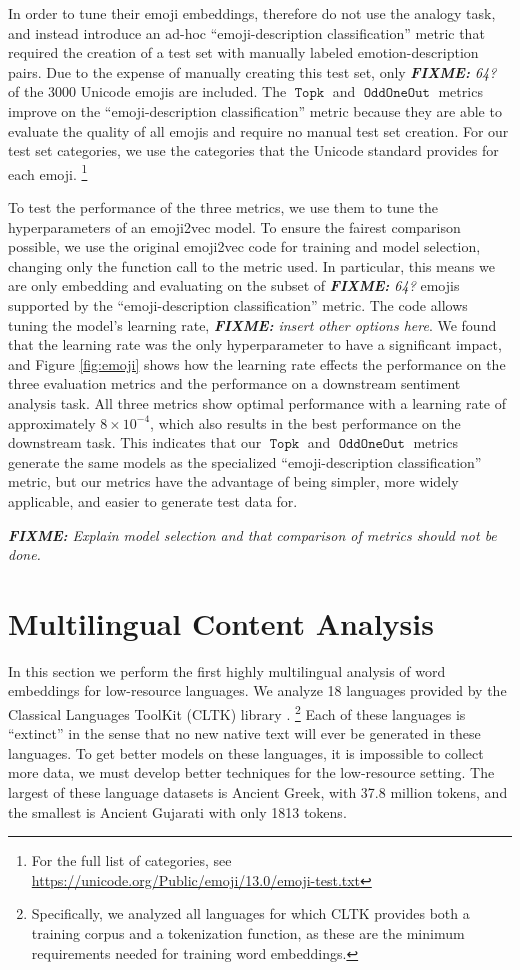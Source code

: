 \documentclass[11pt,a4paper]{article}
\DeclareMathOperator{\OddOneOut}{\texttt{OddOneOut}}
\DeclareMathOperator{\topk}{\texttt{Topk}}
\newcommand{\fixme}[1]{{\color{red}\itshape \textbf{FIXME:} {#1}}}
\begin{document}
In order to tune their emoji embeddings, \citet{eisner2016emoji2vec} therefore do not use the analogy task,
and instead introduce an ad-hoc ``emoji-description classification'' metric that required the creation of a test set with manually labeled emotion-description pairs.
Due to the expense of manually creating this test set,
only \fixme{64?} of the 3000 Unicode emojis are included.
The $\topk$ and $\OddOneOut$ metrics improve on the ``emoji-description classification'' metric because they are able to evaluate the quality of all emojis and require no manual test set creation.
For our test set categories, we use the categories that the Unicode standard provides for each emoji.%
\footnote{For the full list of categories, see \url{https://unicode.org/Public/emoji/13.0/emoji-test.txt}}

To test the performance of the three metrics,
we use them to tune the hyperparameters of an emoji2vec model.
To ensure the fairest comparison possible, we use the original emoji2vec code for training and model selection,
changing only the function call to the metric used.
In particular, this means we are only embedding and evaluating on the subset of \fixme{64?} emojis supported by the ``emoji-description classification'' metric.
The code allows tuning the model's learning rate, \fixme{insert other options here}.
We found that the learning rate was the only hyperparameter to have a significant impact,
and Figure \ref{fig:emoji} shows how the learning rate effects the performance on the three evaluation metrics and the performance on a downstream sentiment analysis task.
All three metrics show optimal performance with a learning rate of approximately $8\times10^{-4}$,
which also results in the best performance on the downstream task.
This indicates that our $\topk$ and $\OddOneOut$ metrics generate the same models as the specialized ``emoji-description classification'' metric,
but our metrics have the advantage of being simpler, more widely applicable, and easier to generate test data for.

\fixme{Explain model selection and that comparison of metrics should not be done.}

\section{Multilingual Content Analysis}
\label{sec:mca}

In this section we perform the first highly multilingual analysis of word embeddings for low-resource languages.
We analyze 18 languages provided by the Classical Languages ToolKit (CLTK) library \citep{johnson2014}.%
\footnote{
    Specifically, we analyzed all languages for which CLTK provides both a training corpus and a tokenization function,
    as these are the minimum requirements needed for training word embeddings.
}
Each of these languages is ``extinct'' in the sense that no new native text will ever be generated in these languages.
To get better models on these languages, it is impossible to collect more data,
we must develop better techniques for the low-resource setting.
The largest of these language datasets is Ancient Greek, with 37.8 million tokens,
and the smallest is Ancient Gujarati with only 1813 tokens.
\end{document}
